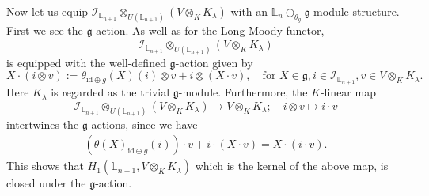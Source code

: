 \documentclass[a4paper,12pt]{article}
\theoremstyle{definition}
\theoremstyle{remark}
\begin{document}
Now let us 
equip $\mathcal{I}_{\mathbb{L}_{n+1}}\otimes_{U(\mathbb{L}_{n+1})} (V\otimes_{K} K_{\lambda})$ with an $\mathbb{L}_{n}\oplus_{\theta_{g}} \mathfrak{g}$-module structure.
First we see the $\mathfrak{g}$-action.
As well as for the Long-Moody functor, 
\[
	\mathcal{I}_{\mathbb{L}_{n+1}}\otimes_{U(\mathbb{L}_{n+1})} (V\otimes_{K} K_{\lambda})
\]
is equipped with the well-defined $\mathfrak{g}$-action given
by
\[
	X\cdot (i\otimes v):=
	\theta_{\mathrm{id}\oplus g}(X)(i)\otimes v+i\otimes (X\cdot v),
	\quad\text{for }
	X\in \mathfrak{g},
i\in \mathcal{I}_{\mathbb{L}_{n+1}}, v\in V\otimes_{K}K_{\lambda}.
\]
Here  
$K_{\lambda}$ is regarded as the trivial 
$\mathfrak{g}$-module.
Furthermore, the $K$-linear map
\[
\mathcal{I}_{\mathbb{L}_{n+1}}\otimes_{U(\mathbb{L}_{n+1})} (V\otimes_{K} K_{\lambda})
\rightarrow 
V\otimes_{K} K_{\lambda};\quad
i\otimes v\mapsto i\cdot v 
\]
intertwines the $\mathfrak{g}$-actions, since we have
\begin{align*}
(\theta(X)_{\mathrm{id}\oplus g}(i))\cdot v+i\cdot (X\cdot v)=X\cdot (i\cdot v).
\end{align*}
This shows that $H_{1}(\mathbb{L}_{n+1}, V\otimes_{K} K_{\lambda})$ 
which is the kernel of the above map,
is closed under the  $\mathfrak{g}$-action.
\end{document}
